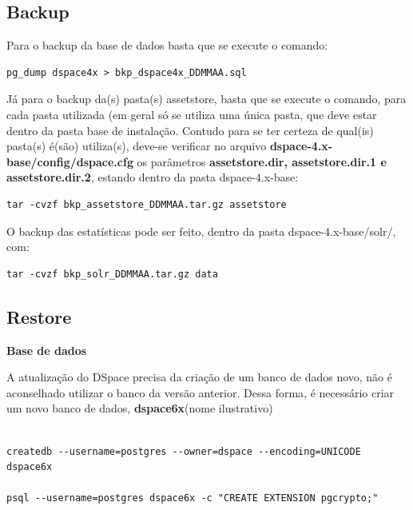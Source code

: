 \documentclass[12pt,hidelinks]{article}
\begin{document}
\subsection{Backup}
Para o backup da base de dados basta que se execute o comando:

\begin{verbatim}
pg_dump dspace4x > bkp_dspace4x_DDMMAA.sql
\end{verbatim}

Já para o backup da(s) pasta(s) assetstore, basta que se execute o comando, para cada pasta utilizada (em geral só se utiliza uma única pasta, que deve estar dentro da pasta base de instalação. Contudo para se ter certeza de qual(is) pasta(s) é(são) utiliza(s), deve-se verificar no arquivo \textbf{dspace-4.x-base/config/dspace.cfg} os parâmetros \textbf{assetstore.dir, assetstore.dir.1 e assetstore.dir.2}, estando dentro da pasta dspace-4.x-base:   

\begin{verbatim}
tar -cvzf bkp_assetstore_DDMMAA.tar.gz assetstore
\end{verbatim}

O backup das estatísticas pode ser feito, dentro da pasta dspace-4.x-base/solr/, com:

\begin{verbatim}
tar -cvzf bkp_solr_DDMMAA.tar.gz data
\end{verbatim}

\subsection{Restore}

\textbf{Base de dados}
\singlespacing

A atualização do DSpace precisa da criação de um banco de dados novo, não é aconselhado utilizar o banco da versão anterior. Dessa forma, é necessário criar um novo banco de dados, \textbf{dspace6x}(nome ilustrativo)




\begin{verbatim}

createdb --username=postgres --owner=dspace --encoding=UNICODE dspace6x

psql --username=postgres dspace6x -c "CREATE EXTENSION pgcrypto;"
\end{verbatim}
\end{document}
